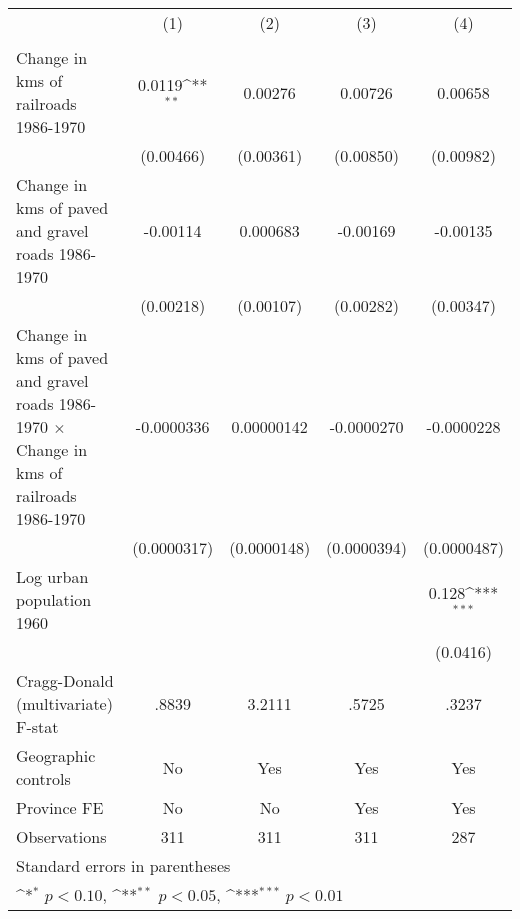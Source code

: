 {
\def\sym#1{\ifmmode^{#1}\else\(^{#1}\)\fi}
\begin{tabular}{l*{4}{c}}
\hline\hline
                &\multicolumn{1}{c}{(1)}&\multicolumn{1}{c}{(2)}&\multicolumn{1}{c}{(3)}&\multicolumn{1}{c}{(4)}\\
                &\multicolumn{1}{c}{}&\multicolumn{1}{c}{}&\multicolumn{1}{c}{}&\multicolumn{1}{c}{}\\
\hline
Change in kms of railroads 1986-1970&   0.0119\sym{**} &  0.00276         &  0.00726         &  0.00658         \\
                &(0.00466)         &(0.00361)         &(0.00850)         &(0.00982)         \\
[1em]
Change in kms of paved and gravel roads 1986-1970& -0.00114         & 0.000683         & -0.00169         & -0.00135         \\
                &(0.00218)         &(0.00107)         &(0.00282)         &(0.00347)         \\
[1em]
Change in kms of paved and gravel roads 1986-1970 $\times$ Change in kms of railroads 1986-1970&-0.0000336         &0.00000142         &-0.0000270         &-0.0000228         \\
                &(0.0000317)         &(0.0000148)         &(0.0000394)         &(0.0000487)         \\
[1em]
Log urban population 1960&                  &                  &                  &    0.128\sym{***}\\
                &                  &                  &                  & (0.0416)         \\
\hline
Cragg-Donald (multivariate) F-stat&    .8839         &   3.2111         &    .5725         &    .3237         \\
Geographic controls&       No         &      Yes         &      Yes         &      Yes         \\
Province FE     &       No         &       No         &      Yes         &      Yes         \\
Observations    &      311         &      311         &      311         &      287         \\
\hline\hline
\multicolumn{5}{l}{\footnotesize Standard errors in parentheses}\\
\multicolumn{5}{l}{\footnotesize \sym{*} \(p<0.10\), \sym{**} \(p<0.05\), \sym{***} \(p<0.01\)}\\
\end{tabular}
}
